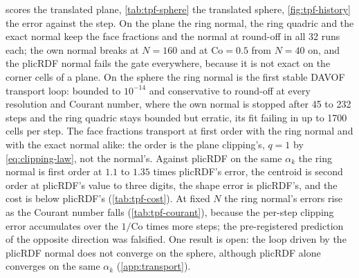  scores the translated plane, \cref{tab:tpf-sphere} the translated sphere, \cref{fig:tpf-history} the error against the step. On the plane the ring normal, the ring quadric and the exact normal keep the face fractions and the normal at round-off in all 32 runs each; the own normal breaks at $N = 160$ and at $\mathrm{Co} = 0.5$ from $N = 40$ on, and the plicRDF normal fails the gate everywhere, because it is not exact on the corner cells of a plane. On the sphere the ring normal is the first stable DAVOF transport loop: bounded to $10^{-14}$ and conservative to round-off at every resolution and Courant number, where the own normal is stopped after 45 to 232 steps and the ring quadric stays bounded but erratic, its fit failing in up to 1700 cells per step. The face fractions transport at first order with the ring normal and with the exact normal alike: the order is the plane clipping's, $q = 1$ by \cref{eq:clipping-law}, not the normal's. Against plicRDF on the same $\alpha_k$ the ring normal is first order at $1.1$ to $1.35$ times plicRDF's error, the centroid is second order at plicRDF's value to three digits, the shape error is plicRDF's, and the cost is below plicRDF's (\cref{tab:tpf-cost}). At fixed $N$ the ring normal's errors rise as the Courant number falls (\cref{tab:tpf-courant}), because the per-step clipping error accumulates over the $1/\mathrm{Co}$ times more steps; the pre-registered prediction of the opposite direction was falsified. One result is open: the loop driven by the plicRDF normal does not converge on the sphere, although plicRDF alone converges on the same $\alpha_k$ (\ref{app:transport}).

\begin{table}[htbp]
\centering
\caption{The translated plane in TwoPhaseFlow: the plane of \cref{sec:plane} carried over $0.2L$ along its normal and along $(1, 0, 0)$, $N = 20, 40, 80, 160$, $\mathrm{Co} = 0.05$ to $0.5$. For every normal source and Courant number the number of the eight runs (two directions, four meshes) in which the face fractions and the normal stay at round-off over the whole run (both run maxima of $L_1$ below $10^{-12}$); the last column is the run maximum of $L_1(\alpha_f)$ at $N = 160$ and $\mathrm{Co} = 0.5$ on the normal arm (for plicRDF and isoAlpha, which carry no face fractions, the normal error). Table body generated by \texttt{make\_table\_advection.py} from the study table.}
\label{tab:tpf-plane}
\footnotesize
\setlength{\tabcolsep}{4pt}
\resizebox{\linewidth}{!}{}
\end{table}

